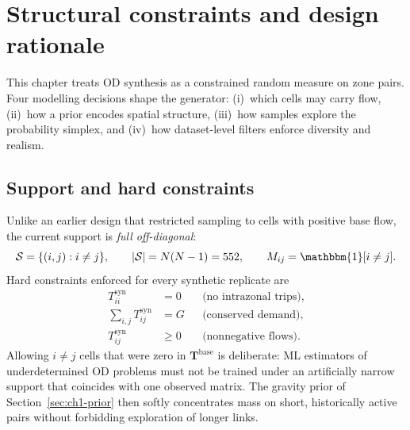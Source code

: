 \documentclass[11pt,a4paper]{report}
\newcommand{\Tbase}{\mathbf{T}^{\mathrm{base}}}
\begin{document}
\section{Structural constraints and design rationale}
\label{sec:ch1-constraints}

This chapter treats OD synthesis as a constrained random measure on zone pairs. Four modelling decisions shape the generator: (i)~which cells may carry flow, (ii)~how a prior encodes spatial structure, (iii)~how samples explore the probability simplex, and (iv)~how dataset-level filters enforce diversity and realism.

\subsection{Support and hard constraints}

Unlike an earlier design that restricted sampling to cells with positive base flow, the current support is \emph{full off-diagonal}:
\begin{equation}
    \mathcal{S} = \{(i,j): i\neq j\}, \qquad
    |\mathcal{S}| = N(N-1) = 552, \qquad
    M_{ij} = \mathbbm{1}[i\neq j].
    \label{eq:full_support}
\end{equation}
Hard constraints enforced for every synthetic replicate are
\begin{align}
    T_{ii}^{\mathrm{syn}} &= 0 && \text{(no intrazonal trips)}, \\
    \sum_{i,j} T_{ij}^{\mathrm{syn}} &= G && \text{(conserved demand)}, \\
    T_{ij}^{\mathrm{syn}} &\ge 0 && \text{(nonnegative flows)}.
\end{align}
Allowing $i\neq j$ cells that were zero in $\Tbase$ is deliberate: ML estimators of underdetermined OD problems must not be trained under an artificially narrow support that coincides with one observed matrix. The gravity prior of Section~\ref{sec:ch1-prior} then softly concentrates mass on short, historically active pairs without forbidding exploration of longer links.
\end{document}
